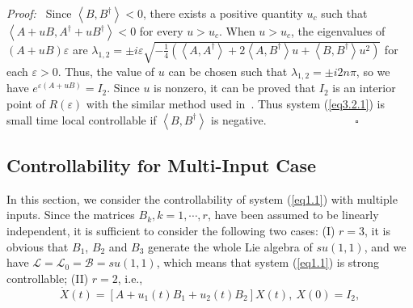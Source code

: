 \documentclass[onecolumn,showpacs,showkeys,preprintnumbers]{revtex4}
\begin{document}
{\it{Proof:~}} Since $\left<B,B^\dag\right><0$, there exists a
positive quantity $u_c$ such that
$\left<A+uB,A^\dag+uB^\dag\right><0$ for every $u>u_c$. When
$u>u_c$, the eigenvalues of $(A+uB)\varepsilon$ are
$\lambda_{1,2}={\pm}{i\varepsilon}\sqrt{-\frac{1}{4}\left(\left<A,A^\dag\right>+2\left<A,B^\dag\right>u+\left<B,B^\dag\right>u^2\right)}$
for each $\varepsilon>0$. Thus, the value of $u$ can be chosen
such that $\lambda_{1,2}={\pm}i2n\pi$, so we have
$e^{\varepsilon(A+uB)}=I_2$. Since $u$ is nonzero, it can be
proved that $I_2$ is an interior point of $R(\varepsilon)$ with
the similar method used in~\cite{Alessandro1}. Thus system
(\ref{eq3.2.1}) is small time local controllable if
$\left<B,B^\dag\right>$ is negative. ~~~~~~~~~~~~~~~$\square$

\subsection{Controllability for Multi-Input
Case}\label{sec3.3}

In this section, we consider the controllability of system
(\ref{eq1.1}) with multiple inputs. Since the matrices
$B_k,k=1,\cdots,r$, have been assumed to be linearly independent,
it is sufficient to consider the following two cases: (I) $r=3$,
it is obvious that $B_1$, $B_2$ and $B_3$ generate the whole Lie
algebra of $su(1,1)$, and we have
$\mathcal{L}=\mathcal{L}_0=\mathcal{B}=su(1,1)$, which means that
system (\ref{eq1.1}) is strong controllable; (II) $r=2$, i.e.,
\noindent\begin{equation}\label{eq3.3.1}
\dot{X}(t)=[A+u_1(t)B_1+u_2(t)B_2]X(t),~X(0)=I_2,
\end{equation}
\end{document}
